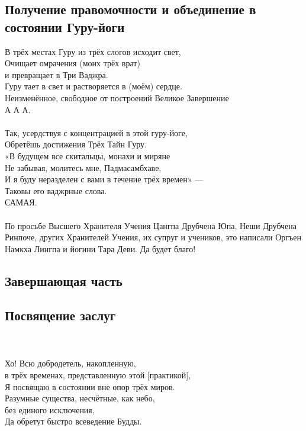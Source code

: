 \subsection*{Получение правомочности и объединение в состоянии Гуру-йоги}
В трёх местах Гуру из трёх слогов исходит свет,\\
Очищает омрачения (моих трёх врат) \\ \indent и превращает в Три Ваджра.\\
Гуру тает в свет и растворяется в (моём) сердце.\\
Неизменённое, свободное от построений Великое Завершение\\
\indent А А А.\\
\\
\scriptsize
Так, усердствуя с концентрацией в этой гуру-йоге,\\
Обретёшь достижения Трёх Тайн Гуру.\\
«В будущем все скитальцы, монахи и миряне\\
Не забывая, молитесь мне, Падмасамбхаве,\\
И я буду неразделен с вами в течение трёх времен» —\\
Таковы его ваджрные слова.\\
САМАЯ.\\
\\
По просьбе Высшего Хранителя Учения Цангпа Друбчена Юпа,
Неши Друбчена Ринпоче, других Хранителей Учения, их супруг и учеников,
это написали Оргъен Намкха Лингпа и йогини Тара Деви. Да будет благо!
\normalsize

\subsection{Завершающая часть}

\subsection*{Посвящение заслуг}\\
\\
Хо! Всю добродетель, накопленную, \\
\indent в трёх временах, представленную этой [практикой],\\
Я посвящаю в состоянии вне опор трёх миров.\\
Разумные существа, несчётные, как небо, \\
\indent без единого исключения,\\
Да обретут быстро всеведение Будды.

